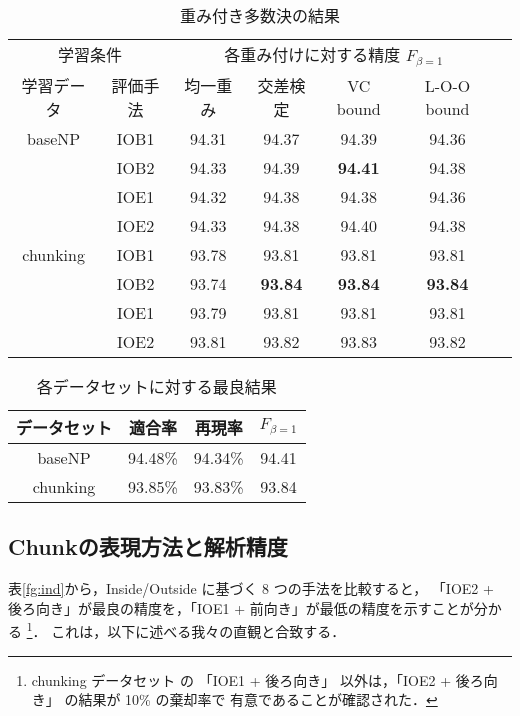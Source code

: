 \begin{table}
\begin{center}
\begin{tabular}{@{}c@{ }c|ccccc@{}}
\hline
\hline
\multicolumn{2}{c|}{学習条件} & \multicolumn{4}{c}{各重み付けに対する精度 $F_{\beta = 1}$} \\
 学習データ &  評価手法 & 均一重み & 交差検定 & VC bound & L-O-O bound \\
\hline
 baseNP &  IOB1 & 94.31 & 94.37 & 94.39 & 94.36      \\
        &  IOB2 & 94.33 & 94.39 & {\bf 94.41} & 94.38 \\
        &  IOE1 & 94.32 & 94.38 & 94.38 & 94.36 \\
        &  IOE2 & 94.33 & 94.38 & 94.40 & 94.38 \\
\hline
 chunking &  IOB1 & 93.78 & 93.81 & 93.81 & 93.81 \\
          &  IOB2 & 93.74 & {\bf 93.84} & {\bf 93.84} & {\bf 93.84} \\
          &  IOE1 & 93.79 & 93.81 & 93.81 & 93.81 \\
          &  IOE2 & 93.81 & 93.82 & 93.83 & 93.82 \\
\end{tabular}
\end{center}
\caption{重み付き多数決の結果}
\label{fg:voting}
\end{table}

\begin{table}
\begin{center}
 \begin{tabular}{c|ccc}
\hline
\hline
  データセット & 適合率 & 再現率 & $F_{\beta = 1}$ \\
\hline
baseNP & 94.48\% & 94.34\% & 94.41\\
chunking & 93.85\% & 93.83\% & 93.84\\
 \end{tabular}
\end{center}
\caption{各データセットに対する最良結果}
\label{fg:best}
\end{table}

 \subsection{Chunkの表現方法と解析精度}
表\ref{fg:ind}から，Inside/Outside に基づく 8 つの手法を比較すると，
「IOE2 + 後ろ向き」が最良の精度を，「IOE1 + 前向き」が最低の精度を示すことが分かる
\footnote{chunking データセット の 「IOE1 + 後ろ向き」 以外は，「IOE2 + 後ろ向き」 の結果が 10\% の棄却率で
有意であることが確認された．}．
これは，以下に述べる我々の直観と合致する．

